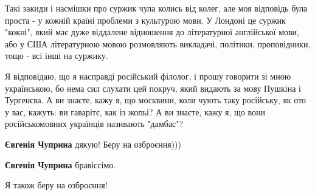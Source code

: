 \begin{itemize}
 

Такі закиди і насмішки про суржик чула колись від колег, але моя відповідь була
проста - у кожній країні проблеми з культурою мови. У Лондоні це суржик
"кокні", який має дуже віддалене відношення до літературної англійської мови,
або у США літературною мовою розмовляють викладачі, політики, проповідники,
тощо - всі інші на суржику.


Я відповідаю, що я насправді російський філолог, і прошу говорити зі мною
українською, бо нема сил слухати цей покруч, який видають за мову Пушкіна і
Тургенєва. А ви знаєте, кажу я, що москвини, коли чують таку російську, як ото
у вас, кажуть: ви гаварітє, как із жопьі? А ви знаєте, кажу я, що вони
російськомовних українців називають "дамбас"?

\begin{itemize}
 
\textbf{Євгенія Чуприна} дякую! Беру на озброєння)))

 
\textbf{Євгенія Чуприна} бравіссімо.

 
Я також беру на озброєння!
\end{itemize}

 

\end{itemize}
